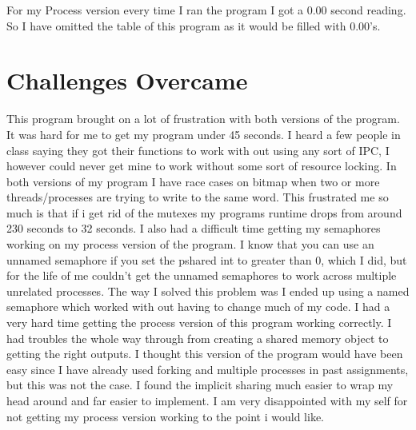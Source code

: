 \documentclass[letterpaper,10pt,notitlepage,fleqn]{article}
\begin{document}
For my Process version every time I ran the program I got a 0.00 second reading. So I have omitted the table of this program as it would be filled with 0.00's.


\section*{Challenges Overcame}
This program brought on a lot of frustration with both versions of the program. It was hard for me to get my program under 45 seconds. I heard a few people in class saying they got their functions to work with out using any sort of IPC, I however could never get mine to work without some sort of resource locking. In both versions of my program I have race cases on bitmap when two or more threads/processes are trying to write to the same word. This frustrated me so much is that if i get rid of the mutexes my programs runtime drops from around 230 seconds to 32 seconds. I also had a difficult time getting my semaphores working on my process version of the program. I know that you can use an unnamed semaphore if you set the pshared int to greater than 0, which I did, but for the life of me couldn't get the unnamed semaphores to work across multiple unrelated processes. The way I solved this problem was I ended up using a named semaphore which worked with out having to change much of my code. I had a very hard time getting the process version of this program working correctly. I had troubles the whole way through from creating a shared memory object to getting the right outputs. I thought this version of the program would have been easy since I have already used forking and multiple processes in past assignments, but this was not the case. I found the implicit sharing much easier to wrap my head around and far easier to implement. I am very disappointed with my self for not getting my process version working to the point i would like. 

    
\end{document}
